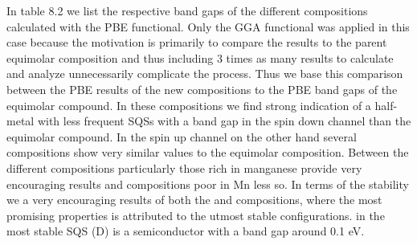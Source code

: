 In table 8.2 we list the respective band gaps of the different compositions calculated with the PBE functional. Only the GGA functional was applied in this case because the motivation is primarily to compare the results to the parent equimolar composition and thus including 3 times as many results to calculate and analyze unnecessarily complicate the process. Thus we base this comparison between the PBE results of the new compositions to the PBE band gaps of the equimolar compound. In these compositions we find strong indication of a half-metal with less frequent SQSs with a band gap in the spin down channel than the equimolar compound. In the spin up channel on the other hand several compositions show very similar values to the equimolar composition. Between the different compositions particularly those rich in manganese provide very encouraging results and compositions poor in Mn less so. In terms of the stability we a very encouraging results of both the  and  compositions, where the most promising properties is attributed to the utmost stable configurations.  in  the most stable SQS (D) is a semiconductor with a band gap around 0.1 eV.
\newpage
